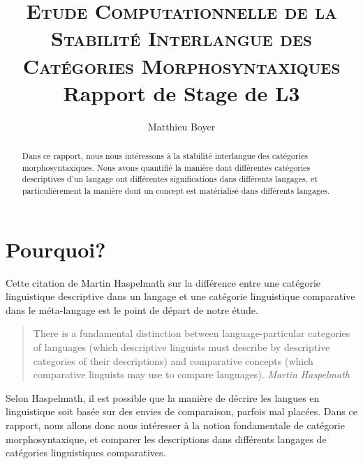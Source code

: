 \documentclass{cours}
\title{\textsc{Etude Computationnelle de la Stabilité Interlangue des Catégories Morphosyntaxiques}\\
{\small Rapport de Stage de L3} }
\author{Matthieu Boyer}
\begin{document}
    \begin{abstract}
        Dans ce rapport, nous nous intéressons à la stabilité interlangue des catégories morphosyntaxiques.
        Nous avons quantifié la manière dont différentes catégories descriptives d'un langage ont différentes
        significations dans différents langages,
        et particulièrement la manière dont un concept est matérialisé dans différents langages.
    \end{abstract}


    \section{Pourquoi?}
    Cette citation de Martin Haspelmath sur la différence entre une catégorie linguistique descriptive dans un langage et une catégorie linguistique comparative dans le méta-langage est le point de départ de notre étude.
    \begin{quote}
        There is a fundamental distinction between language-particular categories of languages (which descriptive
        linguists must describe by descriptive categories of their descriptions) and comparative concepts (which
        comparative linguists may use to compare languages).
        {\flushright
    {\textit{Martin Haspelmath} \cite{Has18}}}
    \end{quote}
    Selon Haspelmath, il est possible que la manière de décrire les langues en linguistique soit basée sur des envies de comparaison, parfois mal placées.
    Dans ce rapport, nous allons donc nous intéresser à la notion fondamentale de catégorie morphosyntaxique, et
    comparer les descriptions dans différents langages de catégories linguistiques comparatives.
\end{document}
